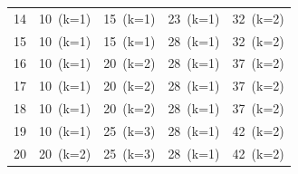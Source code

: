 \documentclass[12pt]{article}
\begin{document}
\begin{landscape}
\begin{longtable}{ccccc}
14 & \cellcolor{green!40}10~(k=1) & \cellcolor{yellow!50}15~(k=1) & \cellcolor{green!40}23~(k=1) & \cellcolor{green!40}32~(k=2) \\
15 & \cellcolor{green!40}10~(k=1) & \cellcolor{yellow!50}15~(k=1) & \cellcolor{green!40}28~(k=1) & \cellcolor{green!40}32~(k=2) \\
16 & \cellcolor{green!40}10~(k=1) & \cellcolor{green!40}20~(k=2) & \cellcolor{green!40}28~(k=1) & \cellcolor{green!40}37~(k=2) \\
17 & \cellcolor{green!40}10~(k=1) & \cellcolor{green!40}20~(k=2) & \cellcolor{green!40}28~(k=1) & \cellcolor{green!40}37~(k=2) \\
18 & \cellcolor{green!40}10~(k=1) & \cellcolor{green!40}20~(k=2) & \cellcolor{green!40}28~(k=1) & \cellcolor{green!40}37~(k=2) \\
19 & \cellcolor{green!40}10~(k=1) & \cellcolor{green!40}25~(k=3) & \cellcolor{green!40}28~(k=1) & \cellcolor{green!40}42~(k=2) \\
20 & \cellcolor{green!40}20~(k=2) & \cellcolor{green!40}25~(k=3) & \cellcolor{green!40}28~(k=1) & \cellcolor{green!40}42~(k=2) \\
\bottomrule
\end{longtable}
\end{landscape}
\end{document}
